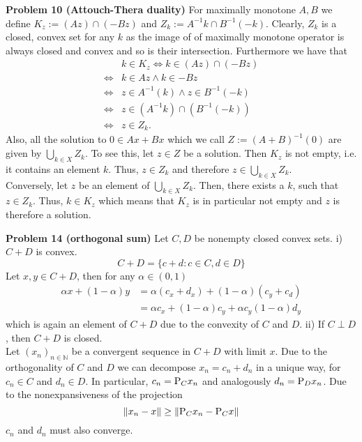 \documentclass{scrartcl}
\newcommand{\N}{\mathbb{N}}
\theoremstyle{plain}
\theoremstyle{remark}
\renewcommand{\P}{\textup{P}}
\begin{document}
\textbf{Problem 10 (Attouch-Thera duality)} For maximally monotone $A,B$ we define $K_{z} := (Az) \cap (-Bz)$ and $Z_{k} := A^{-1}k \cap B^{-1}(-k)$. Clearly, $Z_{k}$ is a closed, convex set for any $k$ as the image of of maximally monotone operator is always closed and convex and so is their intersection.
Furthermore we have that
\begin{equation}
  \begin{aligned}
    & k \in K_{z} \Leftrightarrow k \in (Az) \cap (-Bz) \\
    \Leftrightarrow& k \in Az \wedge k \in -Bz \\
    \Leftrightarrow& z \in A^{-1}(k) \wedge z \in B^{-1}(-k) \\
    \Leftrightarrow& z \in (A^{-1}k) \cap (B^{-1}(-k)) \\
    \Leftrightarrow& z \in Z_{k}.
  \end{aligned}
\end{equation}
Also, all the solution to $0 \in Ax + Bx$ which we call $Z:= {(A + B)}^{-1}(0)$ are given by $\bigcup_{k \in X} Z_{k}$. To see this, let $z \in Z$ be a solution. Then $K_{z}$ is not empty, i.e. it contains an element $k$. 
Thus, $z \in Z_{k}$ and therefore $z \in \bigcup_{k \in X} Z_{k}$.\\
Conversely, let $z$ be an element of $\bigcup_{k \in X} Z_{k}$. Then, there exists a $k$, such that $z \in Z_{k}$. Thus, $k \in K_{z}$ which means that $K_{z}$ is in particular not empty and $z$ is therefore a solution.

\textbf{Problem 14 (orthogonal sum)} Let $C, D$ be nonempty closed convex sets.
i) $C+D$ is convex.
\begin{equation}
  C+D = \{c+d : c \in C, d \in D\}
\end{equation}
Let $x,y \in C+D$, then for any $\alpha \in (0,1)$
\begin{equation}
  \begin{aligned}
    \alpha x+ (1 -\alpha)y &= \alpha(c_x + d_x) + (1-\alpha)(c_y + c_d)\\
    &= \alpha c_x + (1-\alpha) c_y + \alpha c_y (1-\alpha) d_y
  \end{aligned}
\end{equation}
which is again an element of $C+D$ due to the convexity of $C$ and $D$.
ii) If $C \perp D$, then $C+D$ is closed. \\
Let $(x_{n})_{n \in \N}$ be a convergent sequence in $C+D$ with limit $x$. Due to the orthogonality of $C$ and $D$ we can decompose $x_{n} = c_{n} + d_{n}$ in a unique way, for $c_{n} \in C$ and $d_{n} \in D$. In particular, $c_{n} = \P_{C}x_{n}$ and analogously $d_{n} = \P_{D}x_{n}$. Due to the nonexpansiveness of the projection 
\begin{equation}
  \lVert x_{n} - x \rVert \ge \lVert \P_{C}x_{n} - \P_{C}x \rVert
\end{equation}$c_{n}$ and $d_{n}$ must also converge.
\end{document}
